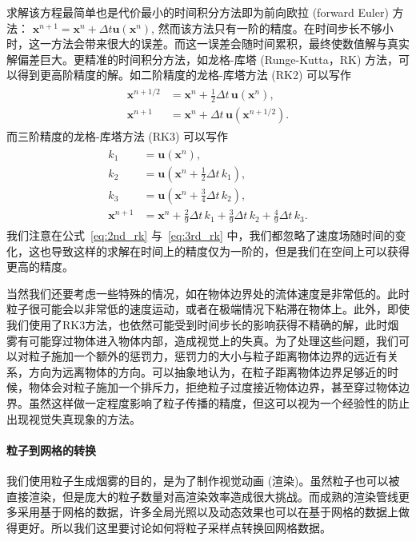 求解该方程最简单也是代价最小的时间积分方法即为前向欧拉 (forward Euler) 方法：
$\mathbf{x}^{n+1}=\mathbf{x}^{n}+\Delta t \mathbf{u}(\mathbf{x}^{n})$,
然而该方法只有一阶的精度。在时间步长不够小时，这一方法会带来很大的误差。而这一误差会随时间累积，最终使数值解与真实解偏差巨大。更精准的时间积分方法，如龙格-库塔 (Runge-Kutta，RK) 方法，可以得到更高阶精度的解。如二阶精度的龙格-库塔方法 (RK2) 可以写作
\begin{align}
    \begin{split}
    \mathbf{x}^{n+1 / 2} & =\mathbf{x}^n+\frac{1}{2} \Delta t \, \mathbf{u}\left(\mathbf{x}^n\right), \\
    \mathbf{x}^{n+1} & =\mathbf{x}^n+\Delta t \, \mathbf{u}\left(\mathbf{x}^{n+1 / 2}\right) .
\end{split}
\label{eq:2nd_rk}
\end{align}
而三阶精度的龙格-库塔方法 (RK3) 可以写作
\begin{align}
    \begin{split}
k_1 & =\mathbf{u}\left(\mathbf{x}^n\right), \\
k_2 & =\mathbf{u}\left(\mathbf{x}^n+\frac{1}{2} \Delta t \, k_1\right), \\
k_3 & =\mathbf{u}\left(\mathbf{x}^n+\frac{3}{4} \Delta t \, k_2\right), \\
\mathbf{x}^{n+1} & =\mathbf{x}^n+\frac{2}{9} \Delta t \, k_1+\frac{3}{9} \Delta t \, k_2+\frac{4}{9} \Delta t \, k_3 .
    \end{split}
    \label{eq:3rd_rk}
\end{align}
我们注意在公式~\ref{eq:2nd_rk} 与~\ref{eq:3rd_rk} 中，我们都忽略了速度场随时间的变化，这也导致这样的求解在时间上的精度仅为一阶的，但是我们在空间上可以获得更高的精度。

当然我们还要考虑一些特殊的情况，如在物体边界处的流体速度是非常低的。此时粒子很可能会以非常低的速度运动，或者在极端情况下粘滞在物体上。此外，即使我们使用了RK3方法，也依然可能受到时间步长的影响获得不精确的解，此时烟雾有可能穿过物体进入物体内部，造成视觉上的失真。为了处理这些问题，我们可以对粒子施加一个额外的惩罚力，惩罚力的大小与粒子距离物体边界的远近有关系，方向为远离物体的方向。可以抽象地认为，在粒子距离物体边界足够近的时候，物体会对粒子施加一个排斥力，拒绝粒子过度接近物体边界，甚至穿过物体边界。虽然这样做一定程度影响了粒子传播的精度，但这可以视为一个经验性的防止出现视觉失真现象的方法。

\paragraph{粒子到网格的转换}
我们使用粒子生成烟雾的目的，是为了制作视觉动画 (渲染)。虽然粒子也可以被直接渲染，但是庞大的粒子数量对高渲染效率造成很大挑战。而成熟的渲染管线更多采用基于网格的数据，许多全局光照以及动态效果也可以在基于网格的数据上做得更好。所以我们这里要讨论如何将粒子采样点转换回网格数据。

